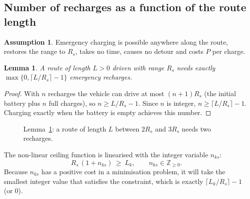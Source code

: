 \documentclass[11pt,a4paper]{article}
\newtheorem{lemma}{Lemma}
\theoremstyle{definition}
\newtheorem{assumption}{Assumption}
\newcommand{\Z}{\mathbb{Z}}
\begin{document}
\subsection{Number of recharges as a function of the route length}
\begin{assumption}
Emergency charging is possible anywhere along the route, restores the range to $R_s$, takes no time, causes no detour and costs $P$ per charge.
\end{assumption}

\begin{lemma}\label{lem:ceil}
A route of length $L>0$ driven with range $R_s$ needs exactly $\max\{0,\lceil L/R_s\rceil-1\}$ emergency recharges.
\end{lemma}
\begin{proof}
With $n$ recharges the vehicle can drive at most $(n+1)R_s$ (the initial battery plus $n$ full charges), so $n\ge L/R_s-1$. Since $n$ is integer, $n\ge\lceil L/R_s\rceil-1$. Charging exactly when the battery is empty achieves this number.
\end{proof}

\begin{figure}[H]
\centering
{}
\caption{Lemma~\ref{lem:ceil}: a route of length $L$ between $2R_s$ and $3R_s$ needs two recharges.}
\end{figure}

The non-linear ceiling function is linearised with the integer variable $n_{ks}$:
\[
R_s\,(1+n_{ks})\ \ge\ L_k,\qquad n_{ks}\in\Z_{\ge 0}.
\]
Because $n_{ks}$ has a positive cost in a minimisation problem, it will take the smallest integer value that satisfies the constraint, which is exactly $\lceil L_k/R_s\rceil-1$ (or $0$).
\end{document}
